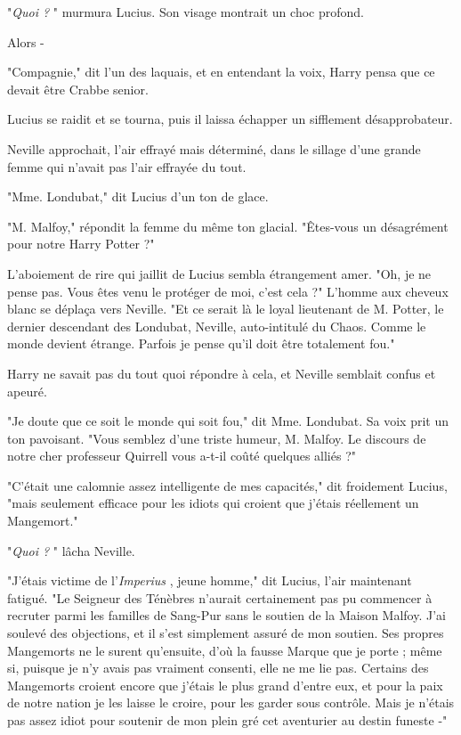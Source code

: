 "\emph{Quoi ?} " murmura Lucius. Son visage montrait un choc profond.

Alors -

"Compagnie," dit l'un des laquais, et en entendant la voix, Harry pensa que ce devait être Crabbe senior.

Lucius se raidit et se tourna, puis il laissa échapper un sifflement désapprobateur.

Neville approchait, l'air effrayé mais déterminé, dans le sillage d'une grande femme qui n'avait pas l'air effrayée du tout.

"Mme. Londubat," dit Lucius d'un ton de glace.

"M. Malfoy," répondit la femme du même ton glacial. "Êtes-vous un désagrément pour notre Harry Potter ?"

L'aboiement de rire qui jaillit de Lucius sembla étrangement amer. "Oh, je ne pense pas. Vous êtes venu le protéger de moi, c'est cela ?" L'homme aux cheveux blanc se déplaça vers Neville. "Et ce serait là le loyal lieutenant de M. Potter, le dernier descendant des Londubat, Neville, auto-intitulé du Chaos. Comme le monde devient étrange. Parfois je pense qu'il doit être totalement fou."

Harry ne savait pas du tout quoi répondre à cela, et Neville semblait confus et apeuré.

"Je doute que ce soit le monde qui soit fou," dit Mme. Londubat. Sa voix prit un ton pavoisant. "Vous semblez d'une triste humeur, M. Malfoy. Le discours de notre cher professeur Quirrell vous a-t-il coûté quelques alliés ?"

"C'était une calomnie assez intelligente de mes capacités," dit froidement Lucius, "mais seulement efficace pour les idiots qui croient que j'étais réellement un Mangemort."

"\emph{Quoi ?} " lâcha Neville.

"J'étais victime de l'\emph{Imperius} , jeune homme," dit Lucius, l'air maintenant fatigué. "Le Seigneur des Ténèbres n'aurait certainement pas pu commencer à recruter parmi les familles de Sang-Pur sans le soutien de la Maison Malfoy. J'ai soulevé des objections, et il s'est simplement assuré de mon soutien. Ses propres Mangemorts ne le surent qu'ensuite, d'où la fausse Marque que je porte ; même si, puisque je n'y avais pas vraiment consenti, elle ne me lie pas. Certains des Mangemorts croient encore que j'étais le plus grand d'entre eux, et pour la paix de notre nation je les laisse le croire, pour les garder sous contrôle. Mais je n'étais pas assez idiot pour soutenir de mon plein gré cet aventurier au destin funeste -"

